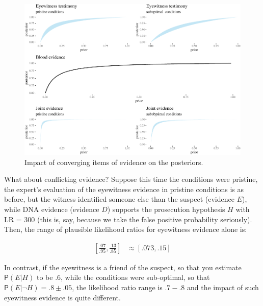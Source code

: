 \documentclass[
  10pt,
  dvipsnames,enabledeprecatedfontcommands]{scrartcl}
\newcommand{\n}{\neg}
\newcommand{\pr}[1]{\mathsf{P}(#1)}
\begin{document}
\begin{figure}[h]

\begin{center}\includegraphics[width=1\linewidth]{lr-chapter4_files/figure-latex/eyewitness2-1} \end{center}
\caption{Impact of converging items of  evidence on the posteriors.}
\label{fig:eyewitness3}
\end{figure}

What about conflicting evidence? Suppose this time the conditions were
pristine, the expert's evaluation of the eyewitness evidence in pristine
conditions is as before, but the witness identified someone else than
the suspect (evidence \(E\)), while DNA evidence (evidence \(D\))
supports the prosecution hypothesis \(H\) with \textsf{LR} = 300 (this
is, say, because we take the false positive probability seriously).
Then, the range of plausible likelihood ratios for eyewitness evidence
alone is:

\begin{align*}
\left[\frac{.07}{.95}, \frac{.13}{.85}    \right ]  & \approx [.073,.15]
\end{align*}

In contrast, if the eyewitness is a friend of the suspect, so that you
estimate \(\pr{E \vert H}\) to be .6, while the conditions were
sub-optimal, so that \(\pr{E\vert \n H} = .8\pm .05\), the likelihood
ratio range is \(.7-.8\) and the impact of such eyewitness evidence is
quite different.

\vspace{1mm}
\footnotesize

\normalsize
\end{document}
